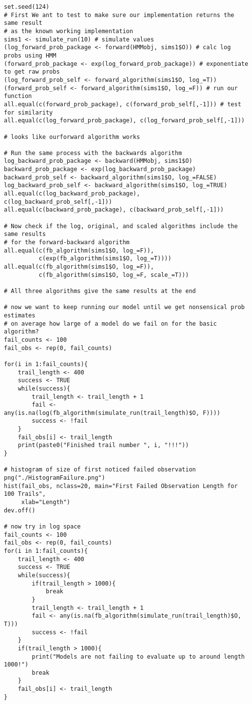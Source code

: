 \documentclass{article} %
\begin{document}
\begin{enumerate}
\begin{verbatim}
set.seed(124)
# First We ant to test to make sure our implementation returns the same result
# as the known working implementation
sims1 <- simulate_run(10) # simulate values
(log_forward_prob_package <- forward(HMMobj, sims1$O)) # calc log probs using HMM
(forward_prob_package <- exp(log_forward_prob_package)) # exponentiate to get raw probs
(log_forward_prob_self <- forward_algorithm(sims1$O, log_=T))
(forward_prob_self <- forward_algorithm(sims1$O, log_=F)) # run our function
all.equal(c(forward_prob_package), c(forward_prob_self[,-1])) # test for similarity
all.equal(c(log_forward_prob_package), c(log_forward_prob_self[,-1]))

# looks like ourforward algorithm works

# Run the same process with the backwards algorithm
log_backward_prob_package <- backward(HMMobj, sims1$O)
backward_prob_package <- exp(log_backward_prob_package)
backward_prob_self <- backward_algorithm(sims1$O, log_=FALSE)
log_backward_prob_self <- backward_algorithm(sims1$O, log_=TRUE)
all.equal(c(log_backward_prob_package), c(log_backward_prob_self[,-1]))
all.equal(c(backward_prob_package), c(backward_prob_self[,-1]))

# Now check if the log, original, and scaled algorithms include the same results
# for the forward-backward algorithm
all.equal(c(fb_algorithm(sims1$O, log_=F)),
          c(exp(fb_algorithm(sims1$O, log_=T))))
all.equal(c(fb_algorithm(sims1$O, log_=F)),
          c(fb_algorithm(sims1$O, log_=F, scale_=T)))

# All three algorithms give the same results at the end

# now we want to keep running our model until we get nonsensical prob estimates
# on average how large of a model do we fail on for the basic algorithm?
fail_counts <- 100
fail_obs <- rep(0, fail_counts)

for(i in 1:fail_counts){
    trail_length <- 400
    success <- TRUE
    while(success){
        trail_length <- trail_length + 1
        fail <- any(is.na(log(fb_algorithm(simulate_run(trail_length)$O, F))))
        success <- !fail
    }
    fail_obs[i] <- trail_length
    print(paste0("Finished trail number ", i, "!!!"))
}

# histogram of size of first noticed failed observation
png("./HistogramFailure.png")
hist(fail_obs, nclass=20, main="First Failed Observation Length for 100 Trails",
     xlab="Length")
dev.off()

# now try in log space
fail_counts <- 100
fail_obs <- rep(0, fail_counts)
for(i in 1:fail_counts){
    trail_length <- 400
    success <- TRUE
    while(success){
        if(trail_length > 1000){
            break
        }
        trail_length <- trail_length + 1
        fail <- any(is.na(fb_algorithm(simulate_run(trail_length)$O, T)))
        success <- !fail
    }
    if(trail_length > 1000){
        print("Models are not failing to evaluate up to around length 1000!")
        break
    }
    fail_obs[i] <- trail_length
}


\end{verbatim}
\end{enumerate}
\end{document}
